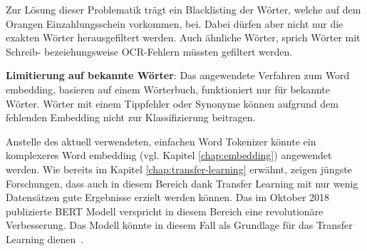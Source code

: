Zur Lösung dieser Problematik trägt ein Blacklisting der Wörter, welche auf dem Orangen Einzahlungsschein vorkommen, bei. Dabei dürfen aber nicht nur die exakten Wörter herausgefiltert werden. Auch ähnliche Wörter, sprich Wörter mit Schreib- bezeiehungsweise OCR-Fehlern müssten gefiltert werden.


\textbf{Limitierung auf bekannte Wörter}: Das angewendete Verfahren zum Word embedding, basieren auf einem Wörterbuch, funktioniert nur für bekannte Wörter. Wörter mit einem Tippfehler oder Synonyme können aufgrund dem fehlenden Embedding nicht zur Klassifizierung beitragen.

Anstelle des aktuell verwendeten, einfachen Word Tokenizer könnte ein komplexeres Word embedding (vgl. Kapitel \ref{chap:embedding}) angewendet werden. Wie bereits im Kapitel \ref{chap:transfer-learning} erwähnt, zeigen jüngste Forschungen, dass auch in diesem Bereich dank Transfer Learning mit nur wenig Datensätzen gute Ergebnisse erzielt werden können. Das im Oktober 2018 publizierte BERT Modell verspricht in diesem Bereich eine revolutionäre Verbesserung. Das Modell könnte in diesem Fall als Grundlage für das Transfer Learning dienen~\autocite{Devlin2018}.
